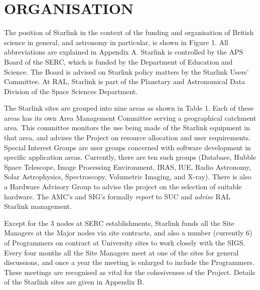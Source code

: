 \section {ORGANISATION}

The position of Starlink in the context of the funding and organisation of
British science in general, and astronomy in particular, is shown in Figure 1.
All abbreviations are explained in Appendix A.
Starlink is controlled by the APS Board of the SERC, which is funded by the
Department of Education and Science.
The Board is advised on Starlink policy matters by the Starlink Users'
Committee.
At RAL, Starlink is part of the Planetary and Astronomical Data Division of
the Space Sciences Department.

The Starlink sites are grouped into nine areas as shown in Table 1.
Each of these areas has its own Area Management Committee serving a
geographical catchment area.
This committee monitors the use being made of the Starlink equipment in that
area, and advises the Project on resource allocation and user requirements.
Special Interest Groups are user groups concerned with software development
in specific application areas.
Currently, there are ten such groups (Database, Hubble Space Telescope, Image
Processing Environment, IRAS, IUE, Radio Astronomy, Solar Astrophysics,
Spectroscopy, Volumetric Imaging, and X-ray).
There is also a Hardware Advisory Group to advise the project on the selection
of suitable hardware.
The AMC's and SIG's formally {\em report} to SUC and {\em advise} RAL Starlink
management.

Except for the 3 nodes at SERC establishments, Starlink funds all the Site
Managers at the Major nodes via site contracts, and also a number
(currently 6) of Programmers on contract at University sites to work closely
with the SIGS.
Every four months all the Site Managers meet at one of the sites for general
discussions, and once a year the meeting is enlarged to include the
Programmers.
These meetings are recognised as vital for the cohesiveness of the Project.
Details of the Starlink sites are given in Appendix B.

